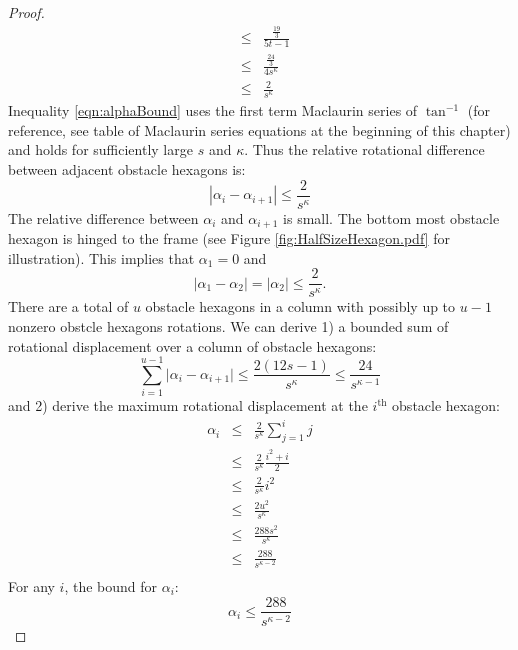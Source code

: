 \documentclass[10pt]{CSUNthesis}
\theoremstyle{plain}%
\theoremstyle{definition}
\theoremstyle{remark}
\newcommand{\ith}{i^\text{th}}
\newcommand{\lr}[1]{\left( #1 \right)}
\newcommand{\vlr}[1]{\left\vert #1 \right\vert}
\begin{document}
\begin{proof}
\begin{equation}
\begin{array}{rcl}
& \leq & \frac{\frac{19}{3}}{5t -1} \\
& \leq & \frac{\frac{24}{3}}{4s^\kappa} \\
&\leq& \frac{2}{s^\kappa}
\end{array} 
\end{equation}
Inequality \ref{eqn:alphaBound} uses the first term Maclaurin series of $\tan^{-1}$ (for reference, see table of Maclaurin series equations at the beginning of this chapter) and holds for sufficiently large $s$ and $\kappa$.  
Thus the relative rotational difference between adjacent obstacle hexagons is:
\begin{equation}\label{eqn:angularBound}
\left\vert \alpha_i - \alpha_{i+1} \right\vert \leq\frac{2}{s^\kappa}
\end{equation}
The relative difference between $\alpha_i$ and $\alpha_{i+1}$ is small.
The bottom most obstacle hexagon is hinged to the frame (see Figure \ref{fig:HalfSizeHexagon.pdf} for illustration). 
This implies that $\alpha_1 = 0$ and
$$\vlr{\alpha_1 - \alpha_2}=\vlr{\alpha_2}\leq \frac{2}{s^\kappa}.$$
There are a total of $u$ obstacle hexagons in a column with possibly up to $u-1$ nonzero obstcle hexagons rotations.
We can derive 1) a bounded sum of rotational displacement over a column of obstacle hexagons:
\begin{equation}\label{eqn:angularSumBound}
\sum_{i=1}^{u-1} \vert \alpha_i - \alpha_{i+1} \vert \leq \frac{2(12s-1)}{s^\kappa} \leq \frac{24}{s^{\kappa-1}}
\end{equation}
and 2) derive the maximum rotational displacement at the $\ith$ obstacle hexagon:
\begin{eqnarray*}
\alpha_i &\leq& \frac{2}{s^\kappa} \sum_{j=1}^i j\\
		 &\leq& \frac{2}{s^\kappa}  \frac{i^2+i}{2}\\
		 &\leq& \frac{2}{s^\kappa}  i^2\\
		 &\leq& \frac{2u^2}{s^\kappa}\\
		 &\leq& \frac{288s^2}{s^{\kappa}}\\
		 &\leq& \frac{288}{s^{\kappa-2}} \\
\end{eqnarray*}
For any $i$, the bound for $\alpha_i$:
\begin{equation}\label{eqn:angularMaxBound}
\alpha_i \leq \frac{288}{s^{\kappa-2}}
\end{equation}


\end{proof}
\end{document}
